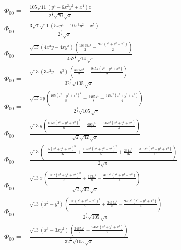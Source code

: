 \documentclass[10pt]{article}
\begin{document}
\begin{align*}
\Phi_{00} = &\frac{105 \sqrt{11} \left( {{y}^{4}}-6 {{x}^{2}} {{y}^{2}}+{{x}^{4}}\right)  z}{{{2}^{\frac{7}{2}}} \sqrt{70} \sqrt{\ensuremath{\pi} }}\\
\Phi_{00} = &\frac{3 \sqrt{7} \sqrt{11} \left( 5 x {{y}^{4}}-10 {{x}^{3}} {{y}^{2}}+{{x}^{5}}\right) }{{{2}^{\frac{9}{2}}} \sqrt{\ensuremath{\pi} }}\\
%
\Phi_{00} = &\frac{\sqrt{13} \left( 4 {{x}^{3}} y-4 x {{y}^{3}}\right) \, \left( \frac{10395 {{z}^{2}}}{2}-\frac{945 \left( {{z}^{2}}+{{y}^{2}}+{{x}^{2}}\right) }{2}\right) }{45 {{2}^{\frac{7}{2}}} \sqrt{14} \sqrt{\ensuremath{\pi} }}\\
\Phi_{00} = &\frac{\sqrt{13} \left( 3 {{x}^{2}} y-{{y}^{3}}\right) \, \left( \frac{3465 {{z}^{3}}}{2}-\frac{945 z\, \left( {{z}^{2}}+{{y}^{2}}+{{x}^{2}}\right) }{2}\right) }{3 {{2}^{\frac{7}{2}}} \sqrt{105} \sqrt{\ensuremath{\pi} }}\\
\Phi_{00} = &\frac{\sqrt{13} x y\, \left( \frac{105 {{\left( {{z}^{2}}+{{y}^{2}}+{{x}^{2}}\right) }^{2}}}{8}+\frac{3465 {{z}^{4}}}{8}-\frac{945 {{z}^{2}} \left( {{z}^{2}}+{{y}^{2}}+{{x}^{2}}\right) }{4}\right) }{{{2}^{\frac{3}{2}}} \sqrt{105} \sqrt{\ensuremath{\pi} }}\\
\Phi_{00} = &\frac{\sqrt{13} y\, \left( \frac{105 z {{\left( {{z}^{2}}+{{y}^{2}}+{{x}^{2}}\right) }^{2}}}{8}+\frac{693 {{z}^{5}}}{8}-\frac{315 {{z}^{3}} \left( {{z}^{2}}+{{y}^{2}}+{{x}^{2}}\right) }{4}\right) }{\sqrt{2} \sqrt{42} \sqrt{\ensuremath{\pi} }}\\
\Phi_{00} = &\frac{\sqrt{13} \left( -\frac{5 {{\left( {{z}^{2}}+{{y}^{2}}+{{x}^{2}}\right) }^{3}}}{16}+\frac{105 {{z}^{2}} {{\left( {{z}^{2}}+{{y}^{2}}+{{x}^{2}}\right) }^{2}}}{16}+\frac{231 {{z}^{6}}}{16}-\frac{315 {{z}^{4}} \left( {{z}^{2}}+{{y}^{2}}+{{x}^{2}}\right) }{16}\right) }{2 \sqrt{\ensuremath{\pi} }}\\
\Phi_{00} = &\frac{\sqrt{13} x\, \left( \frac{105 z {{\left( {{z}^{2}}+{{y}^{2}}+{{x}^{2}}\right) }^{2}}}{8}+\frac{693 {{z}^{5}}}{8}-\frac{315 {{z}^{3}} \left( {{z}^{2}}+{{y}^{2}}+{{x}^{2}}\right) }{4}\right) }{\sqrt{2} \sqrt{42} \sqrt{\ensuremath{\pi} }}\\
\Phi_{00} = &\frac{\sqrt{13} \left( {{x}^{2}}-{{y}^{2}}\right) \, \left( \frac{105 {{\left( {{z}^{2}}+{{y}^{2}}+{{x}^{2}}\right) }^{2}}}{8}+\frac{3465 {{z}^{4}}}{8}-\frac{945 {{z}^{2}} \left( {{z}^{2}}+{{y}^{2}}+{{x}^{2}}\right) }{4}\right) }{{{2}^{\frac{5}{2}}} \sqrt{105} \sqrt{\ensuremath{\pi} }}\\
\Phi_{00} = &\frac{\sqrt{13} \left( {{x}^{3}}-3 x {{y}^{2}}\right) \, \left( \frac{3465 {{z}^{3}}}{2}-\frac{945 z\, \left( {{z}^{2}}+{{y}^{2}}+{{x}^{2}}\right) }{2}\right) }{3 {{2}^{\frac{7}{2}}} \sqrt{105} \sqrt{\ensuremath{\pi} }}\\

\end{align*}
\end{document}
